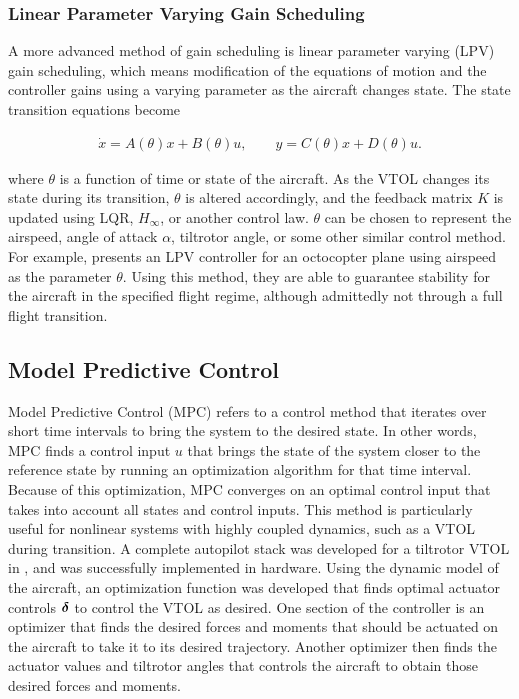 \subsubsection{Linear Parameter Varying Gain Scheduling}

A more advanced method of gain scheduling is linear parameter varying (LPV) gain scheduling, which means modification of the equations of motion and the controller gains using a varying parameter as the aircraft changes state.
The state transition equations become 

\begin{align}
    \dot{x} = A(\theta) x + B(\theta) u, \qquad y = C(\theta)x + D(\theta)u.
\end{align}


where $\theta$ is a function of time or state of the aircraft.
As the VTOL changes its state during its transition, $\theta$ is altered accordingly, and the feedback matrix $K$ is updated using LQR, $H_\infty$, or another control law.
$\theta$ can be chosen to represent the airspeed, angle of attack $\alpha$, tiltrotor angle, or some other similar control method.
For example, \cite{lpv_controller} presents an LPV controller for an octocopter plane using airspeed as the parameter $\theta$.
Using this method, they are able to guarantee stability for the aircraft in the specified flight regime, although admittedly not through a full flight transition.

\subsection{Model Predictive Control}

Model Predictive Control (MPC) refers to a control method that iterates over short time intervals to bring the system to the desired state.
In other words, MPC finds a control input $u$ that brings the state  of the system closer to the reference state by running an optimization algorithm for that time interval.
Because of this optimization, MPC converges on an optimal control input that takes into account all states and control inputs.
This method is particularly useful for nonlinear systems with highly coupled dynamics, such as a VTOL during transition.
A complete autopilot stack was developed for a tiltrotor VTOL in \cite{mpc_controller}, and was successfully implemented in hardware. 
Using the dynamic model of the aircraft, an optimization function was developed that finds optimal actuator controls $\boldsymbol{\delta}$ to control the VTOL as desired.
One section of the controller is an optimizer that finds the desired forces and moments that should be actuated on the aircraft to take it to its desired trajectory.
Another optimizer then finds the actuator values and tiltrotor angles that controls the aircraft to obtain those desired forces and moments.

